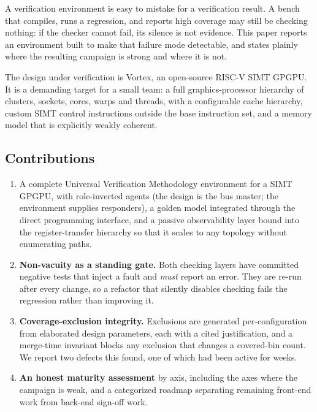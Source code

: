 \documentclass[conference]{IEEEtran}
\begin{document}
A verification environment is easy to mistake for a verification result.
A bench that compiles, runs a regression, and reports high coverage may
still be checking nothing: if the checker cannot fail, its silence is not
evidence. This paper reports an environment built to make that failure
mode detectable, and states plainly where the resulting campaign is strong
and where it is not.

The design under verification is Vortex, an open-source RISC-V SIMT GPGPU.
It is a demanding target for a small team: a full graphics-processor
hierarchy of clusters, sockets, cores, warps and threads, with a
configurable cache hierarchy, custom SIMT control instructions outside the
base instruction set, and a memory model that is explicitly weakly
coherent.

\subsection{Contributions}
\begin{enumerate}
\item A complete Universal Verification Methodology environment for a SIMT
GPGPU, with role-inverted agents (the design is the bus master; the
environment supplies responders), a golden model integrated through the
direct programming interface, and a passive observability layer bound into
the register-transfer hierarchy so that it scales to any topology without
enumerating paths.
\item \textbf{Non-vacuity as a standing gate.} Both checking layers have
committed negative tests that inject a fault and \emph{must} report an
error. They are re-run after every change, so a refactor that silently
disables checking fails the regression rather than improving it.
\item \textbf{Coverage-exclusion integrity.} Exclusions are generated
per-configuration from elaborated design parameters, each with a cited
justification, and a merge-time invariant blocks any exclusion that
changes a covered-bin count. We report two defects this found, one of
which had been active for weeks.
\item \textbf{An honest maturity assessment} by axis, including the axes
where the campaign is weak, and a categorized roadmap separating remaining
front-end work from back-end sign-off work.
\end{enumerate}
\end{document}
